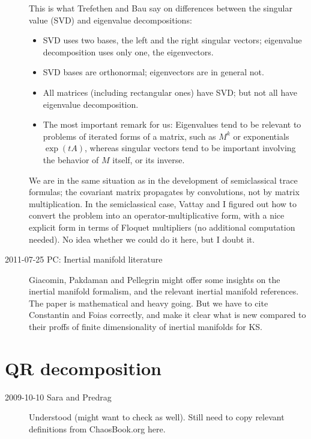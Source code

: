 \begin{description}
This is what Trefethen and Bau say on differences between
the singular value (SVD) and eigenvalue decompositions:
\begin{itemize}
  \item SVD uses two bases, the left and the right singular vectors;
eigenvalue decomposition uses only one, the eigenvectors.
  \item SVD bases are orthonormal; eigenvectors are in general not.
  \item All matrices (including rectangular ones) have SVD; but not all
have eigenvalue decomposition.
	\item The most important remark for us:                \inCB
Eigenvalues tend to be relevant to
problems of iterated forms of a matrix, such as $M^k$ or exponentials
$\exp(t A)$, whereas singular vectors tend to be important involving
the behavior of $M$ itself, or its inverse.
\end{itemize}

We are in the same situation as in the development of semiclassical trace formulas;
the covariant matrix propagates by convolutions, not by matrix multiplication.
In the semiclassical case, Vattay and I figured out how to convert the
problem into an operator-multiplicative form, with
a nice explicit form in terms of Floquet multipliers (no additional
computation needed). No idea whether we could do it here, but I doubt it.

\item[2011-07-25 PC: Inertial manifold literature]
Giacomin, Pakdaman and Pellegrin might offer some insights
on the inertial manifold formalism, and the relevant
inertial manifold references. The paper is mathematical and heavy going.
But we have to cite Constantin and Foias correctly, and make it clear what
is new compared to their proffs of finite dimensionality of inertial
manifolds for KS.


\end{description}

\section{QR decomposition}

\begin{description}
\item[2009-10-10 Sara and Predrag] Understood
     (might want to check
     as well). Still need to copy
    relevant definitions from ChaosBook.org here.
\end{description}

